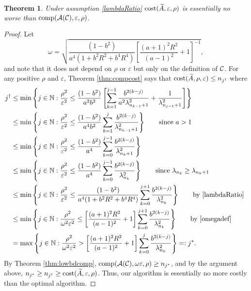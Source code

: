 \documentclass[final]{elsarticle}
\newtheorem{theorem}{Theorem}
\theoremstyle{definition}
\theoremstyle{remark}
\begin{document}
\begin{theorem}
\label{thm:CostNoWorse}
Under assumption \eqref{lambdaRatio} $\operatorname{cost}(\widetilde{A},\varepsilon,\rho)$ is essentially no worse than $\operatorname{comp}(\mathcal{A}(\mathcal{C}),\varepsilon,\rho)$.
\end{theorem}
\begin{proof}
Let  
\begin{equation} \label{omegadef}
    \omega = \sqrt{\frac{(1 - b^2)}{a^4(1 + b^2R^2 + b^4R^4)}\left[\frac{(a+1)^{2} R^2 }{(a-1)^2} + 1\right]^{-1}},
\end{equation}
and note that it does not depend on $\rho$ or $\varepsilon$ but only on the definition of $\mathcal{C}$. 
For any positive $\rho$ and $\varepsilon$, Theorem \ref{thm:compcost} says that $\operatorname{cost}(\widetilde{A},\rho,\varepsilon) \le n_{j^\dagger}$ where 
\begin{align*} 
j^\dagger &\le \min \left \{j \in \mathbb{N} : \frac{\rho^2}{\varepsilon^2} \le \frac{(1 - b^2)}{a^2b^2} \left[ \sum_{k=1}^{j-1} \frac{b^{2(k-j)}}{a^2\lambda_{n_{k-1}+1}^2} + \frac{1}{\lambda_{n_{j-1}+1}^2}\right]   \right\} \\
&\le \min \left \{j \in \mathbb{N} : \frac{\rho^2}{\varepsilon^2} \le \frac{(1 - b^2)}{a^4b^2} \sum_{k=1}^{j} \frac{b^{2(k-j)}}{\lambda_{n_{k-1}+1}^2} \right\} \qquad \text{since } a > 1\\
&\le \min \left \{j \in \mathbb{N} : \frac{\rho^2}{\varepsilon^2} \le \frac{(1 - b^2)}{a^4} \sum_{k=0}^{j-1} \frac{b^{2(k-j)}}{\lambda_{n_{k}+1}^2} \right\} \\
&\le \min \left \{j \in \mathbb{N} : \frac{\rho^2}{\varepsilon^2} \le \frac{(1 - b^2)}{a^4} \sum_{k=0}^{j-1} \frac{b^{2(k-j)}}{\lambda_{n_{k}}^2} \right\} \qquad \text{since } \lambda_{n_k} \ge \lambda_{n_k+1}\\
&\le \min \left \{j \in \mathbb{N} : \frac{\rho^2}{\varepsilon^2} \le \frac{(1 - b^2)}{a^4(1 + b^2R^2 + b^4R^4)} \sum_{k=0}^{j+1} \frac{b^{2(k-j)}}{\lambda_{n_{k}}^2} \right\} \qquad \text{by \eqref{lambdaRatio} } \\
&\le \min \left \{j \in \mathbb{N} : \frac{\rho^2}{\omega^2 \varepsilon^2} \le \left[\frac{(a+1)^{2} R^2 }{(a-1)^2} + 1\right] \sum_{k=0}^{j+1} \frac{b^{2(k-j)}}{\lambda_{n_{k}}^2} \right\} \qquad \text{by \eqref{omegadef} } \\
&= \max \left \{j \in \mathbb{N} : \frac{\rho^2}{\omega^2 \varepsilon^2} > \left[\frac{(a+1)^{2} R^2 }{(a-1)^2} + 1\right] \sum_{k=0}^{j} \frac{b^{2(k-j)}}{\lambda_{n_{k}}^2} \right\} =:j^*.
\end{align*}
By Theorem \ref{thm:lowbdcomp}, $\operatorname{comp}(\mathcal{A}(\mathcal{C}),\omega\varepsilon,\rho) \ge n_{j^*}$, and by the argument above, $n_{j^*} \ge n_{j^\dagger} \ge \operatorname{cost}(\widetilde{A},\varepsilon,\rho)$.  Thus, our algorithm is essentially no more costly than the optimal algorithm.
\end{proof}
\end{document}
